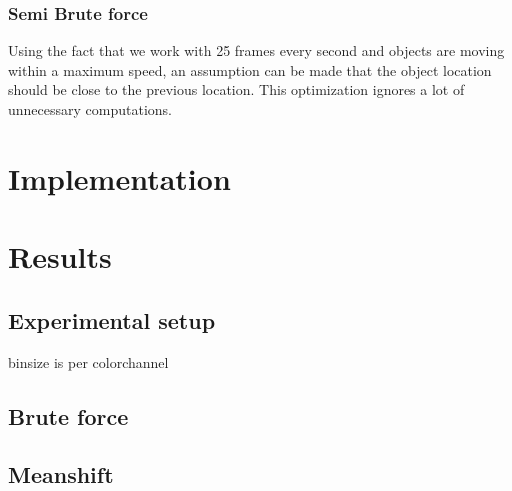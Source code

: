 \documentclass[a4paper,11pt]{article}
\begin{document}
\subsubsection{Semi Brute force}
Using the fact that we work with 25 frames every second and objects are moving within a maximum speed, an assumption can be made that the object location should be close to the previous location. This optimization ignores a lot of unnecessary computations.

	

	




\section{Implementation}

\section{Results} 
	\subsection{Experimental setup} 
	binsize is per colorchannel
	\subsection{Brute force} 
	\subsection{Meanshift} 
\end{document}
